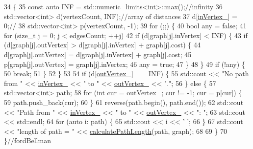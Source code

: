\begin{DoxyCode}
34                                                                            \{
35             \textcolor{keyword}{const} \textcolor{keyword}{auto} INF = std::numeric\_limits<int>::max();\textcolor{comment}{//infinity}
36             std::vector<int> d(vertexCount, INF);\textcolor{comment}{//array of distances}
37             d[\hyperlink{a00005_ae0824ff65f78a73500e1bd4cb6521629_ae0824ff65f78a73500e1bd4cb6521629}{inVertex\_}] = 0;\textcolor{comment}{//}
38             std::vector<int> p(vertexCount, -1);
39             \textcolor{keywordflow}{for} (;;) \{
40                 \textcolor{keywordtype}{bool} any = \textcolor{keyword}{false};
41                 \textcolor{keywordflow}{for} (\textcolor{keywordtype}{size\_t} j = 0; j < edgesCount; ++j)
42                     \textcolor{keywordflow}{if} (d[graph[j].inVertex] < INF) \{
43                         \textcolor{keywordflow}{if} (d[graph[j].outVertex] > d[graph[j].inVertex] + graph[j].cost) \{
44                             d[graph[j].outVertex] = d[graph[j].inVertex] + graph[j].cost;
45                             p[graph[j].outVertex] = graph[j].inVertex;
46                             any = \textcolor{keyword}{true};
47                         \}
48                     \}
49                 \textcolor{keywordflow}{if} (!any) \{
50                     \textcolor{keywordflow}{break};
51                 \}
52             \}
53 
54             \textcolor{keywordflow}{if} (d[\hyperlink{a00005_aa46cc8f01d18634a14d309e88942afa8_aa46cc8f01d18634a14d309e88942afa8}{outVertex\_}] == INF) \{
55                 std::cout << \textcolor{stringliteral}{"No path from "} << \hyperlink{a00005_ae0824ff65f78a73500e1bd4cb6521629_ae0824ff65f78a73500e1bd4cb6521629}{inVertex\_} << \textcolor{stringliteral}{" to "} << 
      \hyperlink{a00005_aa46cc8f01d18634a14d309e88942afa8_aa46cc8f01d18634a14d309e88942afa8}{outVertex\_} << \textcolor{stringliteral}{"."};
56             \} \textcolor{keywordflow}{else} \{
57                 std::vector<int> path;
58                 \textcolor{keywordflow}{for} (\textcolor{keywordtype}{int} cur = \hyperlink{a00005_aa46cc8f01d18634a14d309e88942afa8_aa46cc8f01d18634a14d309e88942afa8}{outVertex\_}; cur != -1; cur = p[cur]) \{
59                     path.push\_back(cur);
60                 \}
61                 reverse(path.begin(), path.end());
62                 std::cout << \textcolor{stringliteral}{"Path from "} << \hyperlink{a00005_ae0824ff65f78a73500e1bd4cb6521629_ae0824ff65f78a73500e1bd4cb6521629}{inVertex\_} << \textcolor{stringliteral}{" to "} << 
      \hyperlink{a00005_aa46cc8f01d18634a14d309e88942afa8_aa46cc8f01d18634a14d309e88942afa8}{outVertex\_} << \textcolor{stringliteral}{": "};
63                 std::cout << std::endl;
64                 \textcolor{keywordflow}{for} (\textcolor{keyword}{auto} i: path) \{
65                     std::cout << i << \textcolor{charliteral}{' '};
66                 \}
67                 std::cout << \textcolor{stringliteral}{"length of path = "} << \hyperlink{a00005_a01eddf0413a37843ec50f9c6da29435e_a01eddf0413a37843ec50f9c6da29435e}{calculatePathLength}(path, graph);
68 
69             \}
70         \}\textcolor{comment}{//fordBellman}
\end{DoxyCode}
